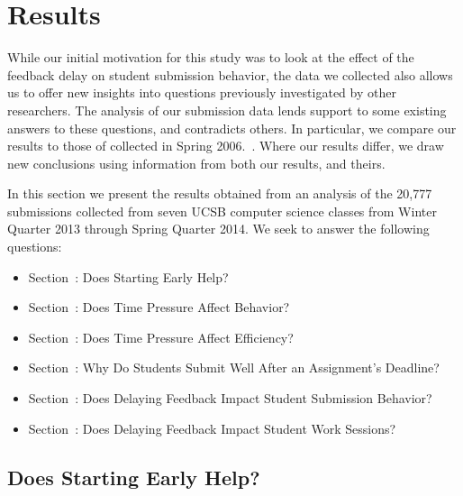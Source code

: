 \section{Results}
While our initial motivation for this study was to look at the effect of the
feedback delay on student submission behavior, the data we collected also
allows us to offer new insights into questions previously investigated by other
researchers. The analysis of our submission data lends support to some existing
answers to these questions, and contradicts others. In particular, we compare
our results to those of \spacco{} collected in Spring
2006.~\cite{Spacco:2013:TIP:2462476.2465594}. Where our results differ, we draw
new conclusions using information from both our results, and theirs.

In this section we present the results obtained from an analysis of the 20,777
submissions collected from seven UCSB computer science classes from Winter
Quarter 2013 through Spring Quarter 2014. We seek to answer the following
questions:

\begin{itemize}
\item Section~: Does Starting Early Help?
\item Section~: Does Time Pressure Affect Behavior?
\item Section~: Does Time Pressure Affect Efficiency?
\item Section~: Why Do Students Submit Well After an
  Assignment's Deadline?
\item Section~: Does Delaying Feedback Impact Student
  Submission Behavior?
\item Section~: Does Delaying Feedback Impact Student
  Work Sessions?
\end{itemize}

\subsection{Does Starting Early Help?}

